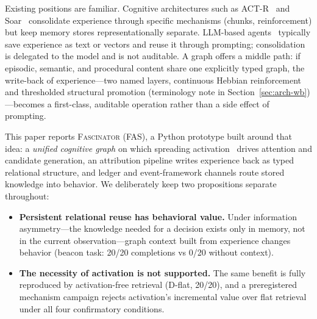 \documentclass[10pt]{article}
\begin{document}
Existing positions are familiar. Cognitive architectures such as ACT-R~\citep{anderson2004integrated} and Soar~\citep{laird2012soar} consolidate experience through specific mechanisms (chunks, reinforcement) but keep memory stores representationally separate. LLM-based agents~\citep{yao2023react,park2023generative,shinn2023reflexion} typically save experience as text or vectors and reuse it through prompting; consolidation is delegated to the model and is not auditable. A graph offers a middle path: if episodic, semantic, and procedural content share one explicitly typed graph, the write-back of experience---two named layers, continuous Hebbian reinforcement and thresholded structural promotion (terminology note in Section~\ref{sec:arch-wb})---becomes a first-class, auditable operation rather than a side effect of prompting.

This paper reports \textsc{Fascinator} (FAS), a Python prototype built around that idea: a \emph{unified cognitive graph} on which spreading activation~\citep{collins1975spreading} drives attention and candidate generation, an attribution pipeline writes experience back as typed relational structure, and ledger and event-framework channels route stored knowledge into behavior. We deliberately keep two propositions separate throughout:

\begin{itemize}
\item[(a)] \textbf{Persistent relational reuse has behavioral value.} Under information asymmetry---the knowledge needed for a decision exists only in memory, not in the current observation---graph context built from experience changes behavior (beacon task: 20/20 completions vs 0/20 without context).
\item[(b)] \textbf{The necessity of activation is not supported.} The same benefit is fully reproduced by activation-free retrieval (D-flat, 20/20), and a preregistered mechanism campaign rejects activation's incremental value over flat retrieval under all four confirmatory conditions.
\end{itemize}
\end{document}
